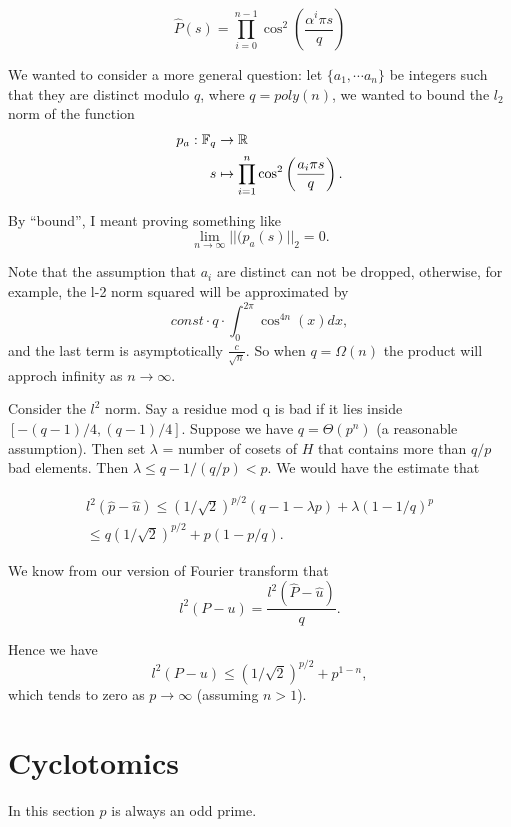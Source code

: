 \documentclass{amsart}
\begin{document}
\begin{Lemma}
\[
    \hat{P}(s) = \prod_{i=0}^{n-1} \cos^2 \left(\frac{\alpha^i \pi s}{q} \right)
\]
\end{Lemma}

We wanted to consider a more general question: let $\{a_1,\cdots a_n\}$ be integers such that they are distinct modulo $q$, where $q = poly(n)$, we wanted to bound the $l_2$
norm of the function
\begin{align*}
   p_{a} : \mathbb{F}_q & \to \mathbb{R} \\
   s & \mapsto \prod_{i=1}^n \cos^2 \left(\frac{a_i \pi s}{q} \right).
\end{align*}

By ``bound'', I meant proving something like
\[
    \lim_{n \to \infty} ||(p_a(s)||_2  = 0.
\]

Note that the assumption that $a_i$ are distinct can not be dropped, otherwise, for example, the l-2 norm squared will be approximated by
\[
    const \cdot q \cdot \int_{0}^{2 \pi} \cos^{4n}(x) dx,
\]
and the last term is asymptotically $\frac{c}{\sqrt{n}}$. So when $q = \Omega(n)$ the product will approch infinity as $n \to \infty$.







Consider the $l^2$ norm. Say a residue mod q is bad if it
lies inside $[-(q-1)/4, (q-1)/4]$. Suppose we have $q = \Theta(p^n)$ (a reasonable assumption). Then set
$\lambda$ = number of cosets of $H$ that contains more than $q/p$ bad elements. Then $\lambda \leq q-1/(q/p) < p$. We would have the estimate that

\begin{align*}
l^2( \hat{p} - \hat{u}) \leq (1/\sqrt{2})^{p/2}(q-1-\lambda p) + \lambda (1-1/q)^p \\
\leq q (1/\sqrt{2})^{p/2} + p (1- p/q).
\end{align*}

We know from our version of Fourier transform that
$$l^2( P - u)  = \frac{l^2( \hat{P} - \hat{u})}{q}.$$

Hence we have
$$l^2( P - u) \leq  (1/\sqrt{2})^{p/2} + p^{1-n},$$
which tends to zero as $p \to \infty$ (assuming $n > 1$).

\section{Cyclotomics}

In this section $p$ is always an odd prime.
\end{document}
